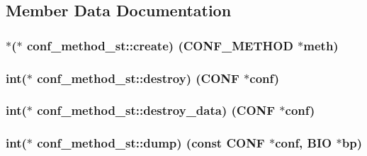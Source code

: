 \subsection{Member Data Documentation}
\subsubsection[{\texorpdfstring{create}{create}}]{$\ast$($\ast$ conf\+\_\+method\+\_\+st\+::create) ({\bf C\+O\+N\+F\+\_\+\+M\+E\+T\+H\+OD} $\ast$meth)}\hypertarget{structconf__method__st_a11f5d812406f403c32ae2b99bb5aae5e}{}\label{structconf__method__st_a11f5d812406f403c32ae2b99bb5aae5e}
\subsubsection[{\texorpdfstring{destroy}{destroy}}]{\setlength{\rightskip}{0pt plus 5cm}int($\ast$ conf\+\_\+method\+\_\+st\+::destroy) ({\bf C\+O\+NF} $\ast$conf)}\hypertarget{structconf__method__st_a9b4f45995dd4fd551e4586aa41ed370e}{}\label{structconf__method__st_a9b4f45995dd4fd551e4586aa41ed370e}
\subsubsection[{\texorpdfstring{destroy\+\_\+data}{destroy_data}}]{\setlength{\rightskip}{0pt plus 5cm}int($\ast$ conf\+\_\+method\+\_\+st\+::destroy\+\_\+data) ({\bf C\+O\+NF} $\ast$conf)}\hypertarget{structconf__method__st_ac68ecdd9bc4dd2cbca6379ae13fd6335}{}\label{structconf__method__st_ac68ecdd9bc4dd2cbca6379ae13fd6335}
\subsubsection[{\texorpdfstring{dump}{dump}}]{\setlength{\rightskip}{0pt plus 5cm}int($\ast$ conf\+\_\+method\+\_\+st\+::dump) (const {\bf C\+O\+NF} $\ast$conf, {\bf B\+IO} $\ast${\bf bp})}\hypertarget{structconf__method__st_a20d82ae26d815bfc82ac54720d867cb9}{}\label{structconf__method__st_a20d82ae26d815bfc82ac54720d867cb9}
